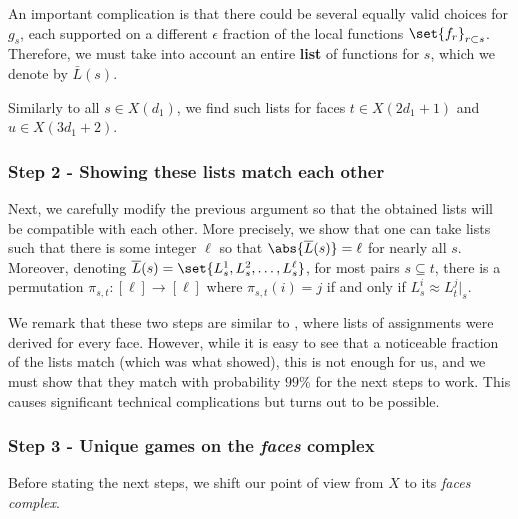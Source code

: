 \documentclass{article}[11pt]
\begin{document}
An important complication is that there could be several equally valid choices for $g_s$, each supported on a different $\epsilon$ fraction of the local functions $\set{f_r}_{r\subset s}$. Therefore, we must take into account an entire \textbf{list} of functions for $s$, which we denote by $\bar L(s)$.

Similarly to all $s\in X(d_1)$, we find such lists for faces $t \in X(2d_1+1)$ and $u \in X(3d_1+2)$.

\subsubsection*{Step 2 - Showing these lists match each other}
Next, we carefully modify the previous argument so that the obtained lists will be compatible with each other. More precisely, we show that one can take lists such that there is some integer \(\ell\) so that \(\abs{\overline{L}(s)}=\ell\) for nearly all \(s\). Moreover, denoting \(\overline{L}(s)=\set{L_s^1,L_s^2,\dots,L_s^\ell}\), for most pairs $s \subseteq t$, there is a permutation \(\pi_{s,t}:[\ell] \to [\ell]\) where \(\pi_{s,t}(i)=j\) if and only if \(L_s^i \approx L_t^j|_s\).

We remark that these two steps are similar to \cite{DinurHKLT2018}, where lists of assignments were derived for every face. However, while it is easy to see that a noticeable fraction of the lists match (which was what \cite{DinurHKLT2018} showed), this is not enough for us, and we must show that they match with probability $99\%$ for the next steps to work. This causes significant technical complications but turns out to be possible.

\subsubsection*{Step 3 - Unique games on the \emph{faces} complex}Before stating the next steps, we shift our point of view from \(X\) to its \emph{faces complex}.
\begin{definition} 
\end{definition}  
\end{document}
